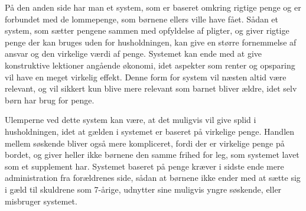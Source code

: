 På den anden side har man et system, som er baseret omkring rigtige penge og er forbundet med de lommepenge, som børnene ellers ville have fået. Sådan et system, som sætter pengene sammen med opfyldelse af pligter, og giver rigtige penge der kan bruges uden for husholdningen, kan give en større fornemmelse af ansvar og den virkelige værdi af penge. Systemet kan ende med at give konstruktive lektioner angående økonomi, idet aspekter som renter og opsparing vil have en meget virkelig effekt. Denne form for system vil næsten altid være relevant, og vil sikkert kun blive mere relevant som barnet bliver ældre, idet selv børn har brug for penge.

Ulemperne ved dette system kan være, at det muligvis vil give splid i husholdningen, idet at gælden i systemet er baseret på virkelige penge. Handlen mellem søskende bliver også mere kompliceret, fordi der er virkelige penge på bordet, og giver heller ikke børnene den samme frihed for leg, som systemet lavet som et supplement har. Systemet baseret på penge kræver i sidste ende mere administration fra forældrenes side, sådan at børnene ikke ender med at sætte sig i gæld til skuldrene som 7-årige, udnytter sine muligvis yngre søskende, eller misbruger systemet.
 